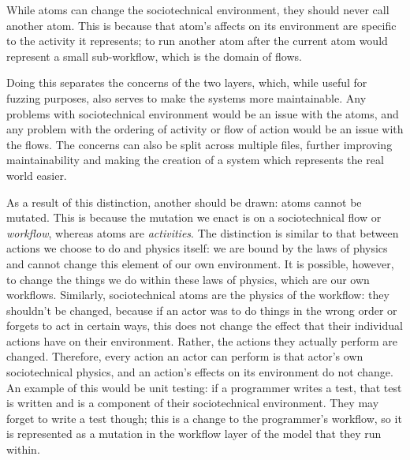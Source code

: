 While atoms can change the sociotechnical environment, they should never call another atom. This is because that atom's affects on its environment are specific to the activity it represents; to run another atom after the current atom would represent a small sub-workflow, which is the domain of flows. \par

Doing this separates the concerns of the two layers, which, while useful for fuzzing purposes, also serves to make the systems more maintainable. Any problems with sociotechnical environment would be an issue with the atoms, and any problem with the ordering of activity or flow of action would be an issue with the flows. The concerns can also be split across multiple files, further improving maintainability and making the creation of a system which represents the real world easier. \par

As a result of this distinction, another should be drawn: atoms cannot be mutated. This is because the mutation we enact is on a sociotechnical flow or \emph{workflow}, whereas atoms are \emph{activities}. The distinction is similar to that between actions we choose to do and physics itself: we are bound by the laws of physics and cannot change this element of our own environment. It is possible, however, to change the things we do within these laws of physics, which are our own workflows. Similarly, sociotechnical atoms are the physics of the workflow: they shouldn't be changed, because if an actor was to do things in the wrong order or forgets to act in certain ways, this does not change the effect that their individual actions have on their environment. Rather, the actions they actually perform are changed. Therefore, every action an actor can perform is that actor's own sociotechnical physics, and an action's effects on its environment do not change. An example of this would be unit testing: if a programmer writes a test, that test is written and is a component of their sociotechnical environment. They may forget to write a test though; this is a change to the programmer's workflow, so it is represented as a mutation in the workflow layer of the model that they run within. \par

